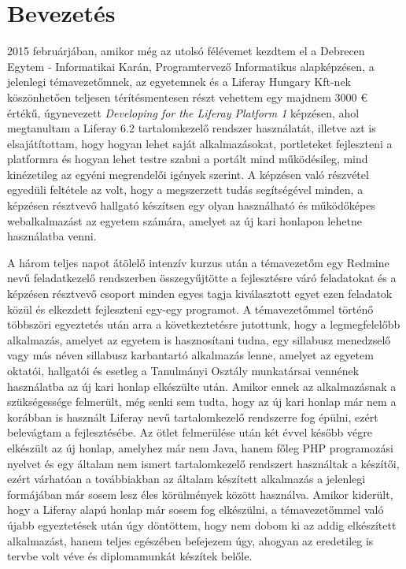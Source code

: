 \documentclass[hidelinks, 12pt, a4paper]{report}
\begin{document}
\clearpage
\setcounter{page}{2}

\tableofcontents

\chapter{Bevezetés}

2015 februárjában, amikor még az utolsó félévemet kezdtem el a Debrecen Egytem - Informatikai Karán, Programtervező Informatikus alapképzésen, a jelenlegi témavezetőmnek, az egyetemnek és a Liferay Hungary Kft-nek köszönhetően teljesen térítésmentesen részt vehettem egy majdnem 3000 € értékű, \cite{liferay-dev-1} úgynevezett \emph{Developing for the Liferay Platform 1} képzésen, ahol megtanultam a Liferay 6.2 tartalomkezelő rendszer \cite{liferay} használatát, illetve azt is elsajátítottam, hogy hogyan lehet saját alkalmazásokat, portleteket fejleszteni a platformra és hogyan lehet testre szabni a portált mind működésileg, mind kinézetileg az egyéni megrendelői igények szerint. A képzésen való részvétel egyedüli feltétele az volt, hogy a megszerzett tudás segítségével minden, a képzésen résztvevő hallgató készítsen egy olyan használható és működőképes webalkalmazást az egyetem számára, amelyet az új kari honlapon lehetne használatba venni.

A három teljes napot átölelő intenzív kurzus után a témavezetőm egy Redmine \cite{redmine} nevű feladatkezelő rendszerben összegyűjtötte a fejlesztésre váró feladatokat és a képzésen résztvevő csoport minden egyes tagja kiválasztott egyet ezen feladatok közül és elkezdett fejleszteni egy-egy programot. A témavezetőmmel történő többszöri egyeztetés után arra a következtetésre jutottunk, hogy a legmegfelelőbb alkalmazás, amelyet az egyetem is hasznosítani tudna, egy sillabusz menedzselő vagy más néven sillabusz karbantartó alkalmazás lenne, amelyet az egyetem oktatói, hallgatói és esetleg a Tanulmányi Osztály munkatársai vennének használatba az új kari honlap elkészülte után. Amikor ennek az alkalmazásnak a szükségessége felmerült, még senki sem tudta, hogy az új kari honlap már nem a korábban is használt Liferay nevű tartalomkezelő rendszerre fog épülni, ezért belevágtam a fejlesztésébe. Az ötlet felmerülése után két évvel később végre elkészült az új honlap, amelyhez már nem Java, hanem főleg PHP programozási nyelvet és egy általam nem ismert tartalomkezelő rendszert használtak a készítői, ezért várhatóan a továbbiakban az általam készített alkalmazás a jelenlegi formájában már sosem lesz éles körülmények között használva. Amikor kiderült, hogy a Liferay alapú honlap már sosem fog elkészülni, a témavezetőmmel való újabb egyeztetések után úgy döntöttem, hogy nem dobom ki az addig elkészített alkalmazást, hanem teljes egészében befejezem úgy, ahogyan az eredetileg is tervbe volt véve és diplomamunkát készítek belőle.
\end{document}
